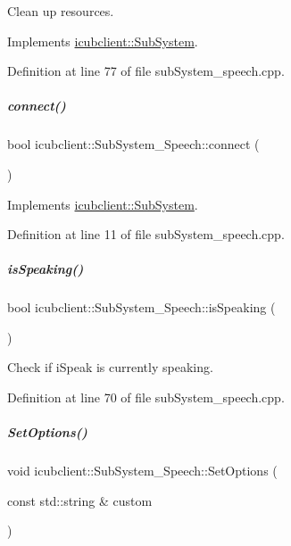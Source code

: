 Clean up resources. 



Implements \hyperlink{group__icubclient__subsystems_af327c56ad0d33aada77f825d96fb47f2}{icubclient\+::\+Sub\+System}.



Definition at line 77 of file sub\+System\+\_\+speech.\+cpp.

\mbox{\label{group__icubclient__subsystems_abbf3a0069184f64f4999b0e94077b2db}} 
\subparagraph{\texorpdfstring{connect()}{connect()}}
{\footnotesize\ttfamily bool icubclient\+::\+Sub\+System\+\_\+\+Speech\+::connect (\begin{DoxyParamCaption}{ }\end{DoxyParamCaption})\hspace{0.3cm}{\ttfamily [virtual]}}



Implements \hyperlink{group__icubclient__subsystems_a5fc84b6e51ec56f91323280b7da52dc8}{icubclient\+::\+Sub\+System}.



Definition at line 11 of file sub\+System\+\_\+speech.\+cpp.

\mbox{\label{group__icubclient__subsystems_acf4c51cc8ebb0373f65ede7f2f2155b6}} 
\subparagraph{\texorpdfstring{is\+Speaking()}{isSpeaking()}}
{\footnotesize\ttfamily bool icubclient\+::\+Sub\+System\+\_\+\+Speech\+::is\+Speaking (\begin{DoxyParamCaption}{ }\end{DoxyParamCaption})}



Check if i\+Speak is currently speaking. 



Definition at line 70 of file sub\+System\+\_\+speech.\+cpp.

\mbox{\label{group__icubclient__subsystems_ae6d315e4436bdd157dd6427fa7274999}} 
\subparagraph{\texorpdfstring{Set\+Options()}{SetOptions()}}
{\footnotesize\ttfamily void icubclient\+::\+Sub\+System\+\_\+\+Speech\+::\+Set\+Options (\begin{DoxyParamCaption}\item[{const std\+::string \&}]{custom }\end{DoxyParamCaption})}



